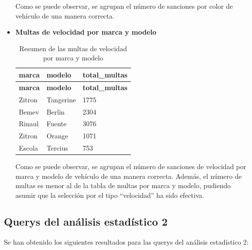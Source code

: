 \documentclass[]{article}
\begin{document}
\begin{itemize}
Como se puede observar, se agrupan el número de sanciones por color de vehículo de una manera correcta.

    \item \textbf{Multas de velocidad por marca y modelo}

\begin{table}[H]
\begin{longtable}{l l l}
    \hline
    \textbf{marca} & \textbf{modelo} & \textbf{total\_multas} \\ \hline
    \endfirsthead
    
    \hline
    \textbf{marca} & \textbf{modelo} & \textbf{total\_multas} \\ \hline
    \endhead
    
    Zitron & Tangerine & 1775 \\ \hline
    Bemev & Berlin & 2304 \\ \hline
    Rinaul & Fuente & 3076 \\ \hline
    Zitron & Orange & 1071 \\ \hline
    Escola & Tercius & 753 \\ \hline
\end{longtable}
\caption{Resumen de las multas de velocidad por marca y modelo}
\end{table}

Como se puede observar, se agrupan el número de sanciones de velocidad por marca y modelo de vehículo de una manera correcta. Además, el número de multas es menor al de la tabla de multas por marca y modelo, pudiendo asumir que la selección por el tipo ``velocidad'' ha sido efectiva.

\end{itemize}

\subsection{Querys del análisis estadístico 2}
Se han obtenido los siguientes resultados para las querys del análisis estadístico 2:
\end{document}
